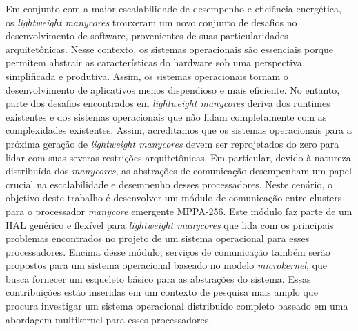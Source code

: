 \begin{resumo}[brazil]
Em conjunto com a maior escalabilidade de desempenho e eficiência energética,
os \textit{lightweight manycores} trouxeram um novo conjunto de desafios no
desenvolvimento de software, provenientes de suas particularidades arquitetônicas.
Nesse contexto, os sistemas operacionais são essenciais porque permitem abstrair
as características do hardware sob uma perspectiva simplificada e produtiva.
Assim, os sistemas operacionais tornam o desenvolvimento de aplicativos
menos dispendioso e mais eficiente.
No entanto, parte dos desafios encontrados em \textit{lightweight manycores}
deriva dos runtimes existentes e dos sistemas operacionais que não lidam
completamente com as complexidades existentes.
Assim, acreditamos que os sistemas operacionais para a próxima geração de
\textit{lightweight manycores} devem ser reprojetados do zero para lidar
com suas severas restrições arquitetônicas.
Em particular, devido à natureza distribuída dos \textit{manycores}, as
abstrações de comunicação desempenham um papel crucial na escalabilidade
e desempenho desses processadores.
Neste cenário, o objetivo deste trabalho é desenvolver um módulo de comunicação
entre clusters para o processador \textit{manycore} emergente MPPA-256.
Este módulo faz parte de um HAL genérico e flexível para \textit{lightweight manycores}
que lida com os principais problemas encontrados no projeto de um sistema operacional
para esses processadores.
Encima desse módulo, serviços de comunicação também serão propostos para
um sistema operacional baseado no modelo \textit{microkernel}, que busca
fornecer um esqueleto básico para as abstrações do sistema.
Essas contribuições estão inseridas em um contexto de pesquisa mais amplo
que procura investigar um sistema operacional distribuído completo baseado
em uma abordagem multikernel para esses processadores.
\end{resumo}

